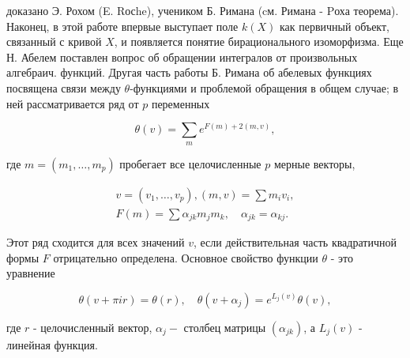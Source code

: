 \documentclass[10pt]{article}
\begin{document}
доказано Э. Рохом (E. Rосhe), учеником Б. Римана (cм. Римана - Pоха теорема). Наконец, в этой работе впервые выступает поле $k(X)$ как первичный объект, связанный с кривой $X$, и появляется понятие бирационального изоморфизма. Еще Н. Абелем поставлен вопрос об обращении интегралов от произвольных алгебраич. функций. Другая часть работы Б. Римана об абелевых функциях посвящена связи между $\theta$-функциями и проблемой обращения в общем случае; в ней рассматривается ряд от $p$ переменных



\[

\theta(v)=\sum_{m} e^{F(m)+2(m, v)},

\]



где $m=\left(m_{1}, \ldots, m_{p}\right)$ пробегает все целочисленные $p$ мерные векторы,



\[

\begin{gathered}

v=\left(v_{1}, \ldots, v_{p}\right),(m, v)=\sum m_{i} v_{i}, \\

F(m)=\sum \alpha_{j k} m_{j} m_{k}, \quad \alpha_{j k}=\alpha_{k j} .

\end{gathered}

\]



Этот ряд сходится для всех значений $v$, если действительная часть квадратичной формы $F$ отрицательно определена. Основное свойство функции $\theta$ - это уравнение



\[

\theta(v+\pi i r)=\theta(r), \quad \theta\left(v+\alpha_{j}\right)=e^{L_{j}(v)} \theta(v),

\]



где $r$ - целочисленный вектор, $\alpha_{j}-$ столбец матрицы $\left(\alpha_{j k}\right)$, а $L_{j}(v)$ - линейная функция.
\end{document}
